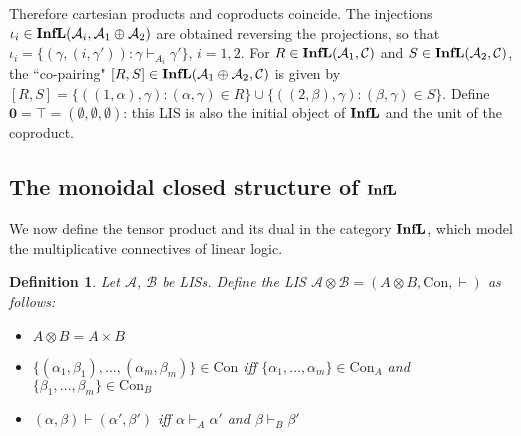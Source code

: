 \documentclass[copyright,creativecommons]{eptcs}
\newtheorem{definition}[theorem]{Definition}
\newcommand{\cA}{\mathcal{A}}
\newcommand{\cB}{\mathcal{B}}
\newcommand{\cC}{\mathcal{C}}
\newcommand{\ga}{\alpha}
\newcommand{\gb}{\beta}
\newcommand{\gc}{\gamma}
\newcommand{\Con}{\mathrm{Con}} \newcommand{\Com}{\mathrm{Com}} \newcommand{\Sup}{\mathrm{Sup}} %
\begin{document}
Therefore cartesian products and coproducts coincide. The injections $\iota_i \in \Infl(\cA_i, \cA_1 \oplus \cA_2)$ are obtained reversing the projections, so that \mbox{$\iota_i = \{(\gc,(i,\gc')) : \gc \vdash_{A_i} \gc' \}$}, $i = 1,2$. For \mbox{$R \in \Infl(\cA_1, \cC)$} and \mbox{$S \in \Infl(\cA_2, \cC)$}, the ``co-pairing" \mbox{$[R, S] \in \Infl(\cA_1 \oplus \cA_2, \cC)$} is given by \\ \mbox{$[R, S] = \{((1,\ga), \gc) : (\ga, \gc) \in R \} \cup \{((2,\gb),\gc) : (\gb, \gc) \in S \}$.} Define $\mathbf{0} = \top = (\emptyset, \emptyset, \emptyset)$: this LIS is also the initial object of $\mathbf{InfL}$ and the unit of the coproduct.

\subsection{The monoidal closed structure of $\mathbf{InfL}$}

We now define the tensor product and its dual in the category $\mathbf{InfL}$, which model the multiplicative connectives of linear logic.

\medskip

\begin{definition}
Let $\cA$, $\cB$ be LISs. Define the LIS $\cA \otimes \cB = (A \otimes B, \Con, \vdash)$ as follows:
\begin{itemize}
\item $A \otimes B = A \times B$
\item $\{(\ga_1, \gb_1), \ldots, (\ga_m, \gb_m)\} \in \Con$ iff $\{\ga_1, \ldots, \ga_m\} \in \Con_A$ and $\{\gb_1, \ldots, \gb_m\} \in \Con_B$
\item $(\ga, \gb) \vdash (\ga',\gb')$ iff $\ga \vdash_A \ga'$ and $\gb \vdash_B \gb'$
\end{itemize}
\end{definition}
\end{document}

